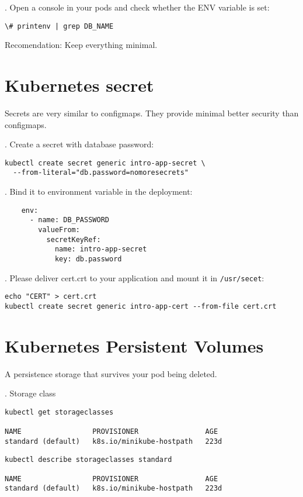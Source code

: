 \documentclass[12pt, letterpaper]{article}
\begin{document}
. Open a console in your pods and check whether the ENV variable is set:

\begin{verbatim}
\# printenv | grep DB_NAME
\end{verbatim}

\bigskip
Recomendation: Keep everything minimal.
%
%
%
\section{Kubernetes secret}

Secrets are very similar to configmaps. They provide minimal better security than configmaps.

. Create a secret with database password:

\begin{verbatim}
kubectl create secret generic intro-app-secret \
  --from-literal="db.password=nomoresecrets"
\end{verbatim}

. Bind it to environment variable in the deployment:

\begin{verbatim}
    env:
      - name: DB_PASSWORD
        valueFrom:
          secretKeyRef:
            name: intro-app-secret
            key: db.password
\end{verbatim}


. Please deliver cert.crt to your application and mount it in \verb|/usr/secet|:

\begin{verbatim}
echo "CERT" > cert.crt
kubectl create secret generic intro-app-cert --from-file cert.crt
\end{verbatim}

%
\section{Kubernetes Persistent Volumes}

A persistence storage that survives your pod being deleted.

. Storage class

\begin{verbatim}
kubectl get storageclasses

NAME                 PROVISIONER                AGE
standard (default)   k8s.io/minikube-hostpath   223d
\end{verbatim}

\begin{verbatim}
kubectl describe storageclasses standard

NAME                 PROVISIONER                AGE
standard (default)   k8s.io/minikube-hostpath   223d
\end{verbatim}
\end{document}
